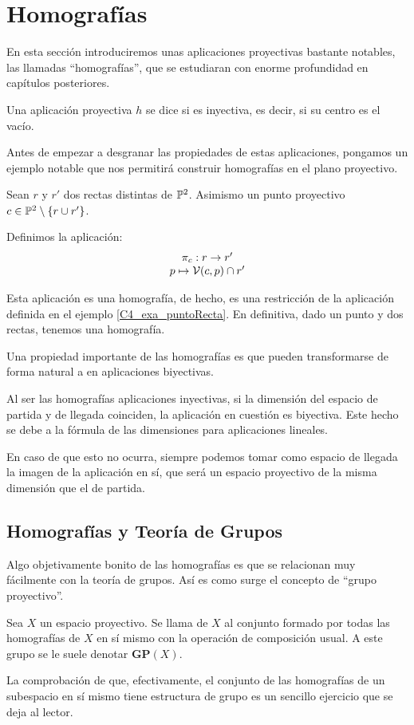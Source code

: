 \section{Homografías}
En esta sección introduciremos unas aplicaciones proyectivas bastante notables, las llamadas ``homografías'', que se estudiaran con enorme profundidad en capítulos posteriores.
\begin{defi}[Homografía]
	\label{C4_def_homografia}
	Una aplicación proyectiva $h$ se dice  si es inyectiva, es decir, si su centro es el vacío.
\end{defi}
Antes de empezar a desgranar las propiedades de estas aplicaciones, pongamos un ejemplo notable que nos permitirá construir homografías en el plano proyectivo.
\begin{exa}
	\label{C4_exa_fabricaHomografias}
	Sean $r$ y $r'$ dos rectas distintas de $\mathbb{P}^2$. Asimismo un punto proyectivo $c\in\mathbb{P}^2\setminus\{r\cup r'\}$.
	
	Definimos la aplicación: \[\begin{array}{c}
	\pi_c:r\to r'\\
	p\mapsto \mathcal{V}(c,p)\cap r'
	\end{array}\]
	
	Esta aplicación es una homografía, de hecho, es una restricción de la aplicación definida en el ejemplo \ref{C4_exa_puntoRecta}. En definitiva, dado un punto y dos rectas, tenemos una homografía.
\end{exa}

Una propiedad importante de las homografías es que pueden transformarse de forma natural a en aplicaciones biyectivas.
\begin{obs}
	Al ser las homografías aplicaciones inyectivas, si la dimensión del espacio de partida y de llegada coinciden, la aplicación en cuestión es biyectiva. Este hecho se debe a la fórmula de las dimensiones para aplicaciones lineales.
	
	En caso de que esto no ocurra, siempre podemos tomar como espacio de llegada la imagen de la aplicación en sí, que será un espacio proyectivo de la misma dimensión que el de partida.
\end{obs}

\subsection{Homografías y Teoría de Grupos}
Algo objetivamente bonito de las homografías es que se relacionan muy fácilmente con la teoría de grupos. Así es como surge el concepto de ``grupo proyectivo''.
\begin{defi}
	Sea $X$ un espacio proyectivo. Se llama  de $X$ al conjunto formado por todas las homografías de $X$ en sí mismo con la operación de composición usual. A este grupo se le suele denotar $\mathbf{GP}(X)$.
\end{defi}
La comprobación de que, efectivamente, el conjunto de las homografías de un subespacio en sí mismo tiene estructura de grupo es un sencillo ejercicio que se deja al lector.


